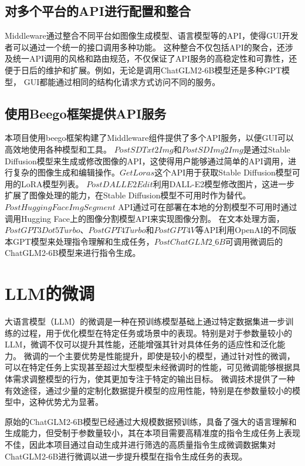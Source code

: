 \documentclass[a4paper,AutoFakeBold,oneside,12pt]{book}
\begin{document}
\subsection{对多个平台的API进行配置和整合}
Middleware通过整合不同平台如图像生成模型、语言模型等的API，使得GUI开发者可以通过一个统一的接口调用多种功能。
这种整合不仅包括API的聚合，还涉及统一API调用的风格和路由规范，不仅保证了API服务的高稳定性和可靠性，还便于日后的维护和扩展。例如，无论是调用ChatGLM2-6B模型还是多种GPT模型，
GUI都能通过相同的结构化请求方式访问不同的服务。


\subsection{使用Beego框架提供API服务}
本项目使用beego框架构建了Middleware组件提供了多个API服务，以便GUI可以高效地使用各种模型和工具。
$PostSDTxt2Img$和$PostSDImg2Img$是通过Stable Diffusion模型来生成或修改图像的API，这使得用户能够通过简单的API调用，进行复杂的图像生成和编辑操作。$GetLoras$这个API用于获取Stable Diffusion模型可用的LoRA模型列表。
$PostDALLE2Edit$利用DALL-E2模型修改图片，这进一步扩展了图像处理的能力，在Stable Diffusion模型不可用时作为替代。
$PostHuggingFaceImgSegment$ API通过可在部署在本地的分割模型不可用时通过调用Hugging Face上的图像分割模型API来实现图像分割。
在文本处理方面，$PostGPT3Dot5Turbo$、$PostGPT4Turbo$和$PostGPT4V$等API利用OpenAI的不同版本GPT模型来处理指令理解和生成任务，$PostChatGLM2\_6B$可调用微调后的ChatGLM2-6B模型来进行指令生成。

\section{LLM的微调} %
大语言模型（LLM）的微调是一种在预训练模型基础上通过特定数据集进一步训练的过程，用于优化模型在特定任务或场景中的表现。特别是对于参数量较小的LLM，微调不仅可以提升其性能，还能增强其针对具体任务的适应性和泛化能力。
微调的一个主要优势是性能提升，即使是较小的模型，通过针对性的微调，可以在特定任务上实现甚至超过大型模型未经微调时的性能，可见微调能够根据具体需求调整模型的行为，使其更加专注于特定的输出目标。
微调技术提供了一种有效途径，通过少量的定制化数据提升模型的应用性能，特别是在参数量较小的模型中，这种优势尤为显著。

原始的ChatGLM2-6B模型已经通过大规模数据预训练，具备了强大的语言理解和生成能力，但受制于参数量较小，其在本项目需要高精准度的指令生成任务上表现不佳，因此本项目通过自动生成并进行筛选的高质量指令生成微调数据集对ChatGLM2-6B进行微调以进一步提升模型在指令生成任务的表现。
\end{document}
